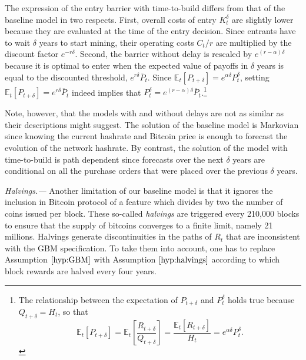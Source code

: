 \documentclass[12pt, a4paper]{article}
\begin{document}
The expression of the entry barrier with time-to-build differs from that
of the baseline model in two respects. First, overall costs of entry $K_t^{\delta}$ are slightly lower because
they are evaluated at the time of the entry decision. Since entrants have to wait $\delta$ years
to start mining, their operating costs $C_t/r$ are multiplied by the discount factor $e^{-r\delta}$.
Second, the barrier without delay is rescaled by $e^{\left( r-\alpha \right)\delta}$
because it is optimal to enter when the expected value of payoffs in $\delta$ years is equal to the discounted
threshold, $e^{r\delta}\overline{P}_t$. Since
$\mathbb{E}_t\left[P_{t+\delta}\right]= e^{\alpha \delta}P^{\delta}_{t}$, setting $\mathbb{E}_t\left[P_{t+\delta}\right]= e^{r\delta}\overline{P}_t$ indeed implies that $P^{\delta}_{t}=e^{\left(r-\alpha\right)\delta}\overline{P}_t$.\footnote{The relationship between the expectation
of $P_{t+\delta}$ and $P^{\delta}_{t}$ holds true because $Q_{t+\delta}=H_{t}$, so that
$$\mathbb{E}_t\left[P_{t+\delta}\right]=\mathbb{E}_t\left[\frac{R_{t+\delta}}{Q_{t+\delta}}\right]
=\frac{\mathbb{E}_t\left[R_{t+\delta}\right]}{H_{t}}= e^{\alpha \delta}P^{\delta}_{t}.$$}

Note, however, that the models with and without delays are not as similar as their descriptions might suggest.
The solution of the baseline model is Markovian since knowing the
current hashrate and Bitcoin price is enough to forecast the evolution
of the network hashrate. By contrast, the solution of the model with time-to-build is path dependent
since forecasts over the next $\delta$ years are conditional on all the
purchase orders that were placed over the previous $\delta$ years.

%

\emph{Halvings.---} Another limitation of our baseline model is that
it ignores the inclusion in Bitcoin protocol
of a feature which divides by two the number of coins issued per block.
These so-called \emph{halvings} are triggered every 210,000 blocks to ensure that the supply of
bitcoins converges to a finite limit, namely 21 millions. Halvings generate
discontinuities in the paths of $R_{t}$ that are inconsistent with the GBM
specification. To take them into account, one has to replace Assumption $\ref{hyp:GBM}$ with Assumption $\ref{hyp:halvings}$
according to which block rewards are halved every four years.
\end{document}
